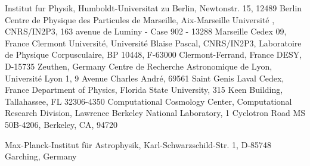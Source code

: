 \documentclass{aastex}   	%
\begin{document}
{
    Institut fur Physik,  Humboldt-Universitat zu Berlin,
    Newtonstr. 15, 12489 Berlin
}
{
    Centre de Physique des Particules de Marseille, 
    Aix-Marseille Universit\'e , CNRS/IN2P3, 
    163 avenue de Luminy - Case 902 - 13288 Marseille Cedex 09, France
}
{
    Clermont Universit\'e, Universit\'e Blaise Pascal, CNRS/IN2P3, Laboratoire de Physique Corpusculaire,
    BP 10448, F-63000 Clermont-Ferrand, France
}
{
    DESY, D-15735 Zeuthen, Germany
}
{
    Centre de Recherche Astronomique de Lyon, Universit\'e Lyon 1,
    9 Avenue Charles Andr\'e, 69561 Saint Genis Laval Cedex, France
}
{
    Department of Physics, Florida State University,
    315 Keen Building, Tallahassee, FL 32306-4350
}
{
    Computational Cosmology Center, Computational Research Division, Lawrence Berkeley National Laboratory, 
    1 Cyclotron Road MS 50B-4206, Berkeley, CA, 94720
}

{
    Max-Planck-Institut f\"ur Astrophysik, Karl-Schwarzschild-Str. 1,
D-85748 Garching, Germany
}

\begin{abstract}
An empirical model for SN~Ia peak magnitudes with two color parameters and dependence on the equivalent widths of CaII, SiII, and SiII velocity
is applied to the supernova sample of the Nearby Supernova Factory.  The peak magnitudes and their colors are found to be 
dependent on the spectral equivalent widths, and two independent color parameters with better than 0.999 confidence.
One parameter, interpreted as due to extrinsic host-galaxy
dust extinction, is consistent with an $R_V=3.06$  \citet{1999PASP..111...63F} dust model.  The second parameter is inconsistent with dust and
is inferred to have origins intrinsic to supernovae.  Our model explains features of external data: 
\textcolor{red}{
the wide range of inferred $R_V$ among
SNe~Ia, the systematically lower inferred $R_V$ of redder supernovae relative to the upper bound of the full population,}
and the colors of SN~2014J,.
\textcolor{red}{
The emergence of a new parameter previously accounted for 
provides an avenue to interpret current Hubble-residual correlations with host-galaxy properties,}
\end{abstract}

\end{document}
